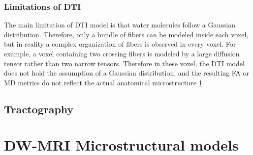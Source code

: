   \subsubsection*{Limitations of DTI}
  The main limitation of DTI model is that water molecules follow a Gaussian distribution. Therefore, only a bundle of fibers can be modeled inside each voxel, but in reality a complex organization of fibers is observed in every voxel. For example, a voxel containing two crossing fibers is modeled by a large diffusion tensor rather than two narrow tensors. Therefore in these voxel, the DTI model does not hold the assumption of a Gaussian distribution, and the resulting FA or MD metrics do not reflect the actual anatomical microstructure \ref{fig:fiber_crossing}.

  \begin{figure}[h]
      \centering
      \caption{}
      \label{fig:fiber_crossing}
  \end{figure}
 \subsection{Tractography}

\section{DW-MRI Microstructural models}
